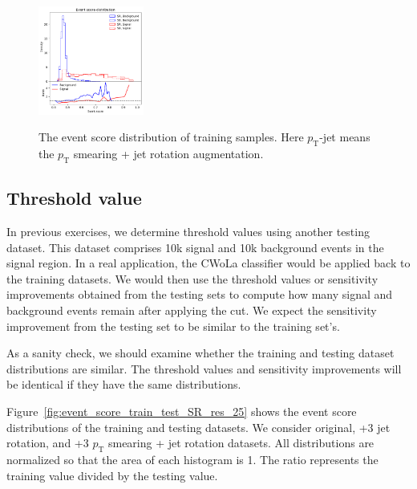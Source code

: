 \documentclass[12pt]{article}
\begin{document}
\begin{figure}[htpb]
{                \includegraphics[width=0.31\textwidth]{HVmodel_event_score_pt_jet_aug_3_train_SR_SB_SB_7_res_25.pdf}
            }
            \caption{The event score distribution of training samples. Here $p_{\text{T}}$-jet means the $p_{\text{T}}$ smearing + jet rotation augmentation.}
            \label{fig:event_score_train_SR_SB_res_25}
        \end{figure}
    \subsection{Threshold value}%
    \label{sub:threshold_value}
        In previous exercises, we determine threshold values using another testing dataset. This dataset comprises 10k signal and 10k background events in the signal region. In a real application, the CWoLa classifier would be applied back to the training datasets. We would then use the threshold values or sensitivity improvements obtained from the testing sets to compute how many signal and background events remain after applying the cut. We expect the sensitivity improvement from the testing set to be similar to the training set's.

        As a sanity check, we should examine whether the training and testing dataset distributions are similar. The threshold values and sensitivity improvements will be identical if they have the same distributions.

        Figure~\ref{fig:event_score_train_test_SR_res_25} shows the event score distributions of the training and testing datasets. We consider original, +3 jet rotation, and +3 $p_{\text{T}}$ smearing + jet rotation datasets. All distributions are normalized so that the area of each histogram is 1. The ratio represents the training value divided by the testing value.
\end{document}
